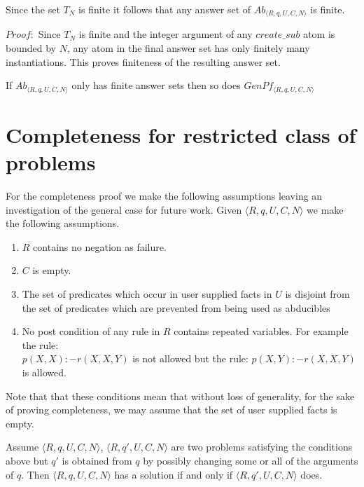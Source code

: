 \documentclass[sigconf]{acmart}
\begin{document}
\begin{lemma}
Since the set $T_{N}$ is finite it follows that any answer set of $Ab_{\langle
  R,q,U,C,N \rangle}$ is finite.
\end{lemma}

$Proof:$ Since $T_{N}$ is finite and the integer argument of any $create\_sub$ atom is bounded by $N$, any atom in the final answer set has only finitely many instantiations. This proves finiteness of the resulting answer set. 
\begin{lemma}
If $Ab_{\langle R,q,U,C,N\rangle}$ only has finite answer sets then so does $GenPf_{\langle R,q,U,C,N\rangle}$
\end{lemma}

\section{Completeness for restricted class of problems}\label{sec:completeness}
For the completeness proof we make the following assumptions leaving an
investigation of the general case for future work. Given $\langle
R,q,U,C,N\rangle$ we make the following assumptions. 

\begin{enumerate}
\item $R$ contains no negation as failure.
\item $C$ is empty.
\item The set of predicates which occur in user supplied facts in $U$ is
  disjoint from the set of predicates which are prevented from being used as
  abducibles
\item No post condition of any rule in $R$ contains repeated variables. For example the rule:\\
$p(X,X):-r(X,X,Y)$ is not allowed but the rule: $p(X,Y):-r(X,X,Y)$ is allowed.
\end{enumerate}

Note that that these conditions mean that without loss of generality, for the sake of proving completeness, we may assume that the set of user supplied facts is empty.

\begin{lemma}
Assume $\langle R,q,U,C,N\rangle$, $\langle R,q',U,C,N\rangle$ are two
problems satisfying the conditions above but $q'$ is obtained from $q$ by
possibly changing some or all of the arguments of $q$. Then $\langle
R,q,U,C,N\rangle$ has a solution if and only if $\langle R,q',U,C,N\rangle$
does.
\end{lemma}
\end{document}
